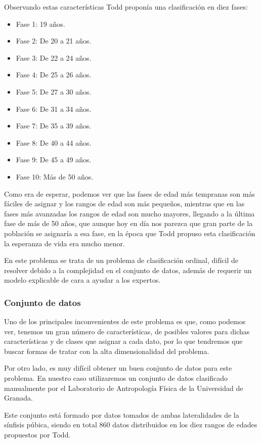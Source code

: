 Observando estas características Todd proponía una clasificación en diez fases:

\begin{itemize}
	\item Fase 1: 19 años.
	\item Fase 2: De 20 a 21 años.
	\item Fase 3: De 22 a 24 años.
	\item Fase 4: De 25 a 26 años.
	\item Fase 5: De 27 a 30 años.
	\item Fase 6: De 31 a 34 años.
	\item Fase 7: De 35 a 39 años.
	\item Fase 8: De 40 a 44 años.
	\item Fase 9: De 45 a 49 años.
	\item Fase 10: Más de 50 años.
\end{itemize}

Como era de esperar, podemos ver que las fases de edad más tempranas son más fáciles de asignar y los rangos de edad son más pequeños, mientras que en las fases más avanzadas los rangos de edad son mucho mayores, llegando a la última fase de más de 50 años, que aunque hoy en día nos parezca que gran parte de la población se asignaría a esa fase, en la época que Todd propuso esta clasificación la esperanza de vida era mucho menor.

En este problema se trata de un problema de clasificación ordinal, difícil de resolver debido a la complejidad en el conjunto de datos, además de requerir un modelo explicable de cara a ayudar a los expertos.

\subsubsection{Conjunto de datos}

Uno de los principales inconvenientes de este problema es que, como podemos ver, tenemos un gran número de características, de posibles valores para dichas características y de clases que asignar a cada dato, por lo que tendremos que buscar formas de tratar con la alta dimensionalidad del problema.

Por otro lado, es muy difícil obtener un buen conjunto de datos para este problema. En nuestro caso utilizaremos un conjunto de datos clasificado manualmente por el Laboratorio de Antropología Física de la Universidad de Granada\cite{laboratorioForenseUGR}.

Este conjunto está formado por datos tomados de ambas lateralidades de la sínfisis púbica, siendo en total 860 datos distribuidos en los diez rangos de edades propuestos por Todd.

